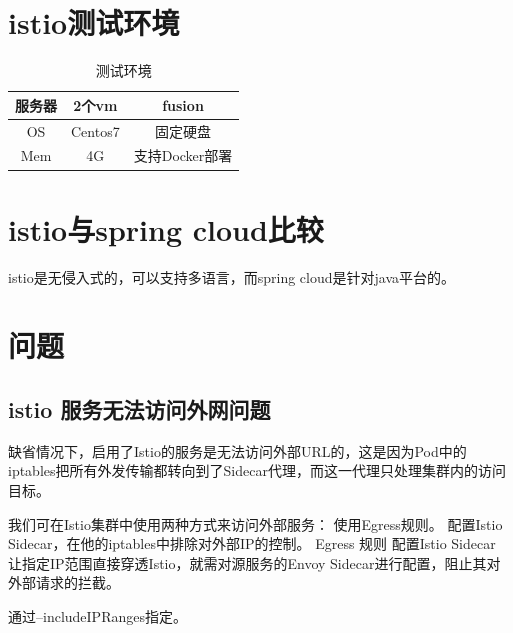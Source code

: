 \documentclass{ctexart}
\begin{document}
\section{istio测试环境}



\begin{table}[h]
	\centering
	\caption{测试环境}\label{tab:tab1}
	\begin{tabular}{|c|c|c|}
		\hline
		服务器 & 2个vm & fusion \\\hline
		OS & Centos7 & 固定硬盘 \\\hline
		Mem & 4G  & 支持Docker部署 \\
		\hline
	\end{tabular}
\end{table}


\section{istio与spring cloud比较}
istio是无侵入式的，可以支持多语言，而spring cloud是针对java平台的。

\section{问题}

\subsection{istio 服务无法访问外网问题}
缺省情况下，启用了Istio的服务是无法访问外部URL的，这是因为Pod中的iptables把所有外发传输都转向到了Sidecar代理，而这一代理只处理集群内的访问目标。

我们可在Istio集群中使用两种方式来访问外部服务：
使用Egress规则。
配置Istio Sidecar，在他的iptables中排除对外部IP的控制。 
Egress 规则
配置Istio Sidecar 
让指定IP范围直接穿透Istio，就需对源服务的Envoy Sidecar进行配置，阻止其对外部请求的拦截。

通过--includeIPRanges指定。


\end{document}
